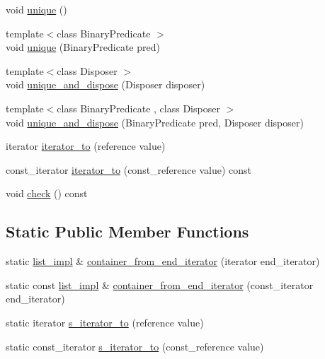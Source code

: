 \begin{DoxyCompactItemize}
\item 
void \hyperlink{classboost_1_1intrusive_1_1list__impl_a9c7d8dd6a59be1e0c73eb19d1a6d0a50}{unique} ()
\item 
{\footnotesize template$<$class Binary\+Predicate $>$ }\\void \hyperlink{classboost_1_1intrusive_1_1list__impl_a2d237761bc8d589a706731a9e1b2da2f}{unique} (Binary\+Predicate pred)
\item 
{\footnotesize template$<$class Disposer $>$ }\\void \hyperlink{classboost_1_1intrusive_1_1list__impl_a782aa8957c448e81553e803349b5f159}{unique\+\_\+and\+\_\+dispose} (Disposer disposer)
\item 
{\footnotesize template$<$class Binary\+Predicate , class Disposer $>$ }\\void \hyperlink{classboost_1_1intrusive_1_1list__impl_ad3b3e0225cd52b5563fe2f2a2b49e3b2}{unique\+\_\+and\+\_\+dispose} (Binary\+Predicate pred, Disposer disposer)
\item 
iterator \hyperlink{classboost_1_1intrusive_1_1list__impl_a51dd273b7b1163b87030157a59189a9e}{iterator\+\_\+to} (reference value)
\item 
const\+\_\+iterator \hyperlink{classboost_1_1intrusive_1_1list__impl_a67a906c22bb2ca0a9ddfc60224f5d8ba}{iterator\+\_\+to} (const\+\_\+reference value) const
\item 
void \hyperlink{classboost_1_1intrusive_1_1list__impl_a7ae0ab138848f3a6fbe7da6f44617a75}{check} () const
\end{DoxyCompactItemize}
\subsection*{Static Public Member Functions}
\begin{DoxyCompactItemize}
\item 
static \hyperlink{classboost_1_1intrusive_1_1list__impl}{list\+\_\+impl} \& \hyperlink{classboost_1_1intrusive_1_1list__impl_a1432b9781e8f4525d61d0a529f37d03c}{container\+\_\+from\+\_\+end\+\_\+iterator} (iterator end\+\_\+iterator)
\item 
static const \hyperlink{classboost_1_1intrusive_1_1list__impl}{list\+\_\+impl} \& \hyperlink{classboost_1_1intrusive_1_1list__impl_a1dabad9119bf0e3ab256f08944e14521}{container\+\_\+from\+\_\+end\+\_\+iterator} (const\+\_\+iterator end\+\_\+iterator)
\item 
static iterator \hyperlink{classboost_1_1intrusive_1_1list__impl_aa6f586f577be78dc3acf107cd4b92d29}{s\+\_\+iterator\+\_\+to} (reference value)
\item 
static const\+\_\+iterator \hyperlink{classboost_1_1intrusive_1_1list__impl_a649d0e05d1597b0b8054006cb3d217c3}{s\+\_\+iterator\+\_\+to} (const\+\_\+reference value)
\end{DoxyCompactItemize}
